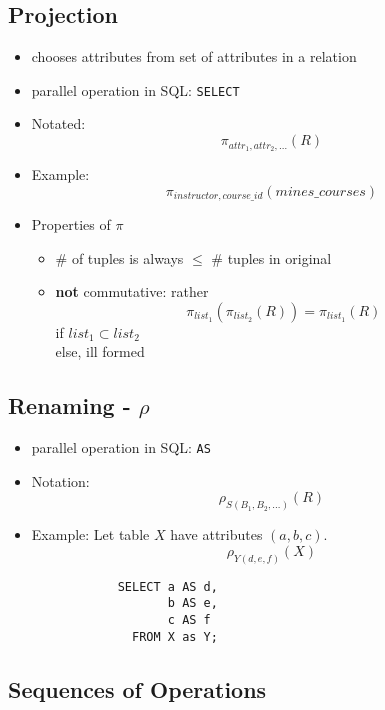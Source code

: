 \documentclass{../cheatsheet}
\begin{document}
\begin{multicols*}{2}
    \subsection{Projection}
    \begin{itemize}
        \item chooses attributes from set of attributes in a relation
        \item parallel operation in SQL: \texttt{SELECT}
        \item Notated:
            \[\pi_{attr_1,attr_2,\dots}(R)\]
        \item Example:
            \[\pi_{instructor, course\_id}(mines\_courses)\]
        \item Properties of $\pi$
            \begin{itemize}
                \item \# of tuples is always $\leq$ \# tuples in original
                \item \textbf{not} commutative: rather
                    \[\pi_{list_1}(\pi_{list_2}(R)) = \pi_{list_1}(R)\]
                    if $list_1 \subset list_2$\\
                    else, ill formed
            \end{itemize}
    \end{itemize}

    \subsection{Renaming - $\rho$}
    \begin{itemize}
        \item parallel operation in SQL: \texttt{AS}
        \item Notation:
            \[\rho_{S(B_1, B_2,\dots)}(R) \]
        \item Example:
            Let table $X$ have attributes $(a, b, c)$.
            \[\rho_{Y(d, e, f)}(X)\]
            \begin{verbatim}
            SELECT a AS d,
                   b AS e,
                   c AS f
              FROM X as Y;
            \end{verbatim}
    \end{itemize}

    \subsection{Sequences of Operations}

\end{multicols*}
\end{document}
